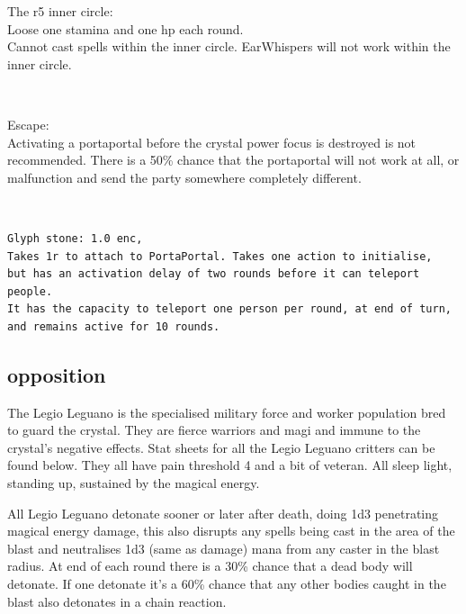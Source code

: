 The r5 inner circle:\\
Loose one stamina and one hp each round.\\
Cannot cast spells within the inner circle.
EarWhispers will not work within the inner circle.

\

Escape:\\
Activating a portaportal before the crystal power focus is destroyed is not recommended. There is a 50\% chance that the portaportal will not work at all, or malfunction and send the party somewhere completely different.

\

\begin{samepage}
\small \begin{verbatim}
Glyph stone: 1.0 enc,
Takes 1r to attach to PortaPortal. Takes one action to initialise,
but has an activation delay of two rounds before it can teleport people.
It has the capacity to teleport one person per round, at end of turn,
and remains active for 10 rounds.
\end{verbatim} \normalsize
\end{samepage}






\subsection*{opposition}
The Legio Leguano is the specialised military force and worker population bred to guard the crystal. They are fierce warriors and magi and immune to the crystal's negative effects. Stat sheets for all the Legio Leguano critters can be found below. They all have pain threshold 4 and a bit of veteran. All sleep light, standing up, sustained by the magical energy.

All Legio Leguano detonate sooner or later after death, doing 1d3 penetrating magical energy damage, this also disrupts any spells being cast in the area of the blast and neutralises 1d3 (same as damage) mana from any caster in the blast radius. At end of each round there is a 30\% chance that a dead body will detonate. If one detonate it's a 60\% chance that any other bodies caught in the blast also detonates in a chain reaction.

